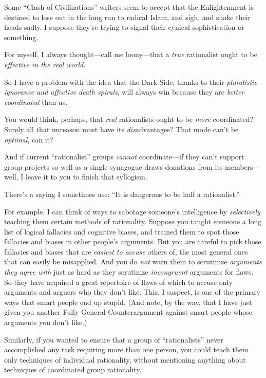 {
 Some ``Clash of Civilizations''
writers seem to accept that the Enlightenment is destined to lose out
in the long run to radical Islam, and sigh, and shake their heads
sadly. I suppose they're trying to signal their cynical
sophistication or something.}

{
 For myself, I always thought---call me loony---that a
\textit{true} rationalist ought to be \textit{effective in the real
world}.}

{
 So I have a problem with the idea that the Dark Side, thanks to
their \textit{pluralistic ignorance and affective death spirals}, will
always win because they are \textit{better coordinated} than us.}

{
 You would think, perhaps, that \textit{real} rationalists ought to
be \textit{more} coordinated? Surely all that unreason must have its
\textit{dis}advantages? That mode can't be
\textit{optimal}, can it?}

{
 And if current ``rationalist''
groups \textit{cannot} coordinate---if they can't
support group projects so well as a single synagogue draws donations
from its members---well, I leave it to you to finish that syllogism.}

{
 There's a saying I sometimes use:
``It is dangerous to be half a
rationalist.''}

{
 For example, I can think of ways to sabotage
someone's intelligence by \textit{selectively} teaching
them certain methods of rationality. Suppose you taught someone a long
list of logical fallacies and cognitive biases, and trained them to
spot those fallacies and biases in other people's
arguments. But you are careful to pick those fallacies and biases that
are \textit{easiest to accuse} others of, the most general ones that
can easily be misapplied. And you do \textit{not} warn them to
scrutinize \textit{arguments they agree with} just as hard as they
scrutinize \textit{incongruent} arguments for flaws. So they have
acquired a great repertoire of flaws of which to accuse only arguments
and arguers who they don't like. This, I suspect, is
one of the primary ways that smart people end up stupid. (And note, by
the way, that I have just given you another Fully General
Counterargument against smart people whose arguments you
don't like.)}

{
 Similarly, if you wanted to ensure that a group of
``rationalists'' never accomplished
any task requiring more than one person, you could teach them only
techniques of individual rationality, without mentioning anything about
techniques of coordinated group rationality.}


